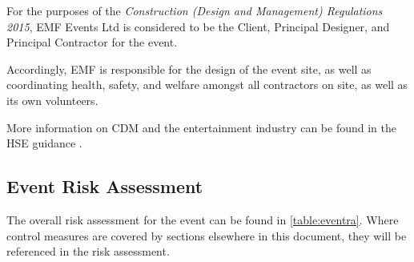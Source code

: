 For the purposes of the \textit{Construction (Design and Management) Regulations 2015},
EMF Events Ltd is considered to be the Client, Principal Designer,
and Principal Contractor for the event.

Accordingly, EMF is responsible for the design of the event site, as well as
coordinating health, safety, and welfare amongst all contractors on site, as well
as its own volunteers.

More information on CDM and the entertainment industry can be found in the HSE
guidance \cite{cdmguidance}.

\subsection{Event Risk Assessment}
The overall risk assessment for the event can be found in \cref{table:eventra}.
Where control measures are covered by sections elsewhere in this document, they
will be referenced in the risk assessment.


